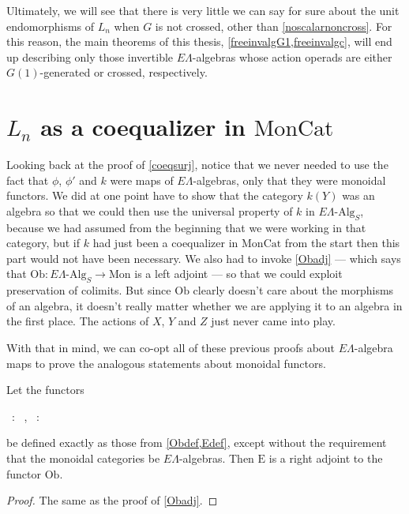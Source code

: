 \documentclass{amsbook} %
\newenvironment{eq*}{\begin{equation*}}{\end{equation*}}
\numberwithin{section}{chapter}
\begin{document}
Ultimately, we will see that there is very little we can say for sure about the unit endomorphisms of $L_n$ when $G$ is not crossed, other than \cref{noscalarnoncross}. For this reason, the main theorems of this thesis, \cref{freeinvalgG1,freeinvalgc}, will end up describing only those invertible $E\Lambda$-algebras whose action operads are either $G(1)$-generated or crossed, respectively.

\section{\texorpdfstring{$L_n$}{L_n} as a coequalizer in \texorpdfstring{$\mathrm{MonCat}$}{MonCat}} \label{colimmoncat}

Looking back at the proof of \cref{coeqsurj}, notice that we never needed to use the fact that $\phi$, $\phi'$ and $k$ were maps of $E\Lambda$-algebras, only that they were monoidal functors. We did at one point have to show that the category $k(Y)$ was an algebra so that we could then use the universal property of $k$ in $E\Lambda\mbox{-}\mathrm{Alg}_S$, because we had assumed from the beginning that we were working in that category, but if $k$ had just been a coequalizer in $\mathrm{MonCat}$ from the start then this part would not have been necessary. We also had to invoke \cref{Obadj} --- which says that $\mathrm{Ob}: E\Lambda\mbox{-}\mathrm{Alg}_S \to \mathrm{Mon}$ is a left adjoint --- so that we could exploit preservation of colimits. But since $\mathrm{Ob}$ clearly doesn't care about the morphisms of an algebra, it doesn't really matter whether we are applying it to an algebra in the first place. The actions of $X$, $Y$ and $Z$ just never came into play.

With that in mind, we can co-opt all of these previous proofs about $E\Lambda$-algebra maps to prove the analogous statements about monoidal functors.

\begin{prop}\label{Obadjmon} Let the functors 
\begin{eq*}  \, : \,  \to {}, \quad \quad \quad {} \, : \,  \to {} \end{eq*}
be defined exactly as those from \cref{Obdef,Edef}, except without the requirement that the monoidal categories be $E\Lambda$-algebras. Then $\mathrm{E}$ is a right adjoint to the functor $\mathrm{Ob}$. 
\end{prop}
\begin{proof}
The same as the proof of \cref{Obadj}.
\end{proof}
\end{document}
